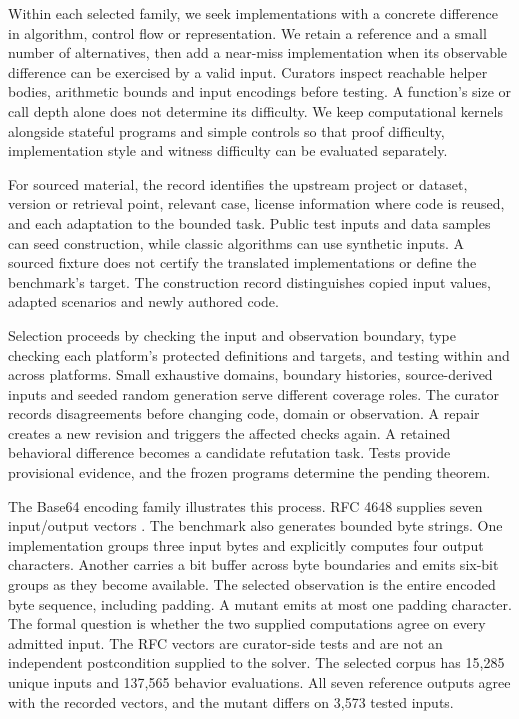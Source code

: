 \documentclass{article}
\begin{document}
Within each selected family, we seek implementations with a concrete difference in algorithm, control flow or representation. We retain a reference and a small number of alternatives, then add a near-miss implementation when its observable difference can be exercised by a valid input. Curators inspect reachable helper bodies, arithmetic bounds and input encodings before testing. A function's size or call depth alone does not determine its difficulty. We keep computational kernels alongside stateful programs and simple controls so that proof difficulty, implementation style and witness difficulty can be evaluated separately.

For sourced material, the record identifies the upstream project or dataset, version or retrieval point, relevant case, license information where code is reused, and each adaptation to the bounded task. Public test inputs and data samples can seed construction, while classic algorithms can use synthetic inputs. A sourced fixture does not certify the translated implementations or define the benchmark's target. The construction record distinguishes copied input values, adapted scenarios and newly authored code.

Selection proceeds by checking the input and observation boundary, type checking each platform's protected definitions and targets, and testing within and across platforms. Small exhaustive domains, boundary histories, source-derived inputs and seeded random generation serve different coverage roles. The curator records disagreements before changing code, domain or observation. A repair creates a new revision and triggers the affected checks again. A retained behavioral difference becomes a candidate refutation task. Tests provide provisional evidence, and the frozen programs determine the pending theorem.

The Base64 encoding family illustrates this process. RFC 4648 supplies seven input/output vectors \citep{rfc4648}. The benchmark also generates bounded byte strings. One implementation groups three input bytes and explicitly computes four output characters. Another carries a bit buffer across byte boundaries and emits six-bit groups as they become available. The selected observation is the entire encoded byte sequence, including padding. A mutant emits at most one padding character. The formal question is whether the two supplied computations agree on every admitted input. The RFC vectors are curator-side tests and are not an independent postcondition supplied to the solver. The selected corpus has 15,285 unique inputs and 137,565 behavior evaluations. All seven reference outputs agree with the recorded vectors, and the mutant differs on 3,573 tested inputs.
\end{document}
